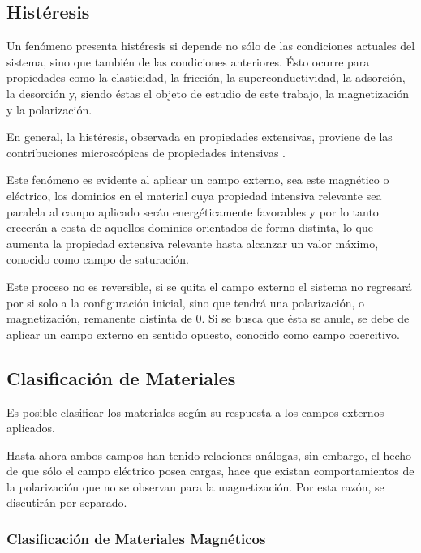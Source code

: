 \documentclass[../main.tex]{subfiles}
\begin{document}
\subsection{Histéresis} \label{sec:hist}
Un fenómeno presenta histéresis si depende no sólo de las condiciones actuales del sistema, sino que también de las condiciones anteriores. Ésto ocurre para propiedades como la elasticidad, la fricción, la superconductividad, la adsorción, la desorción y, siendo éstas el objeto de estudio de este trabajo, la magnetización y la polarización.

En general, la histéresis, observada en propiedades extensivas, proviene de las contribuciones microscópicas de propiedades intensivas \cite{Visintin2006}.

Este fenómeno es evidente al aplicar un campo externo, sea este magnético o eléctrico, los dominios en el material cuya propiedad intensiva relevante sea paralela al campo aplicado serán energéticamente favorables y por lo tanto crecerán a costa de aquellos dominios orientados de forma distinta, lo que aumenta la propiedad extensiva relevante hasta alcanzar un valor máximo, conocido como campo de saturación.

Este proceso no es reversible, si se quita el campo externo el sistema no regresará por si solo a la configuración inicial, sino que tendrá una polarización, o magnetización, remanente distinta de 0. Si se busca que ésta se anule, se debe de aplicar un campo externo en sentido opuesto, conocido como campo coercitivo.
\subsection{Clasificación de Materiales}
Es posible clasificar los materiales según su respuesta a los campos externos aplicados.

Hasta ahora ambos campos han tenido relaciones análogas, sin embargo, el hecho de que sólo el campo eléctrico posea cargas, hace que existan comportamientos de la polarización que no se observan para la magnetización. Por esta razón, se discutirán por separado.
\subsubsection{Clasificación de Materiales Magnéticos}
\end{document}

